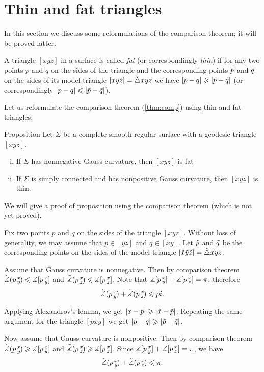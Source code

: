 \section{Thin and fat triangles}

In this section we discuss some reformulations of the comparison theorem;
it will be proved latter.

A triangle $[xyz]$ in a surface is called \emph{fat} (or correspondingly \emph{thin})
if for any two points $p$ and $q$ on the sides of the triangle and the corresponding points 
$\~p$ and $\~q$ on the sides of its model triangle $[\~x\~y\~z]\z=\~\triangle xyz$ we have
$|p-q|\ge |\~p-\~q|$ (or correspondingly $|p-q|\le |\~p-\~q|$).

Let us reformulate the comparison theorem (\ref{thm:comp}) using thin and fat triangles:

\begin{thm}{Proposition}
Let $\Sigma$ be a complete smooth regular surface with a geodesic triangle $[xyz]$.
\begin{enumerate}[(i)]
 \item If $\Sigma$ has nonnegative Gauss curvature, then $[xyz]$ is fat
 \item If $\Sigma$ is simply connected and has nonpositive Gauss curvature,
 then $[xyz]$ is thin.
\end{enumerate}
\end{thm}

We will give a proof of proposition using the comparison theorem (which is not yet proved).

Fix two points $p$ and $q$ on the sides of the triangle $[xyz]$.
Without loss of generality, we may assume that $p\in [yz]$ and $q\in [xy]$.
Let $\~p$ and $\~q$ be the corresponding points on the sides of the  model triangle $[\~x\~y\~z]\z=\~\triangle xyz$.

Assume that Gauss curvature is nonnegative.
Then by comparison theorem $\angk pxy\le \measuredangle \hinge pxy$ and $\angk pxz\le \measuredangle \hinge pxz$.
Note that $\measuredangle \hinge pxy+\measuredangle \hinge pxz=\pi$;
therefore
\[\angk pxy +\angk pxz\le pi.\]

Applying Alexandrov's lemma, we get $|x-p|\ge |\~x-\~p|$.
Repeating the same argument for the triangle $[pxy]$ we get $|p-q|\ge |\~p-\~q|$.

Now assume that Gauss curvature is nonpositive.
Then by comparison theorem $\angk pxy\ge \measuredangle \hinge pxy$ and $\angk pxz\ge \measuredangle \hinge pxz$.
Since $\measuredangle \hinge pxy+\measuredangle \hinge pxz=\pi$, we have
\[\angk pxy +\angk pxz\le \pi.\]

